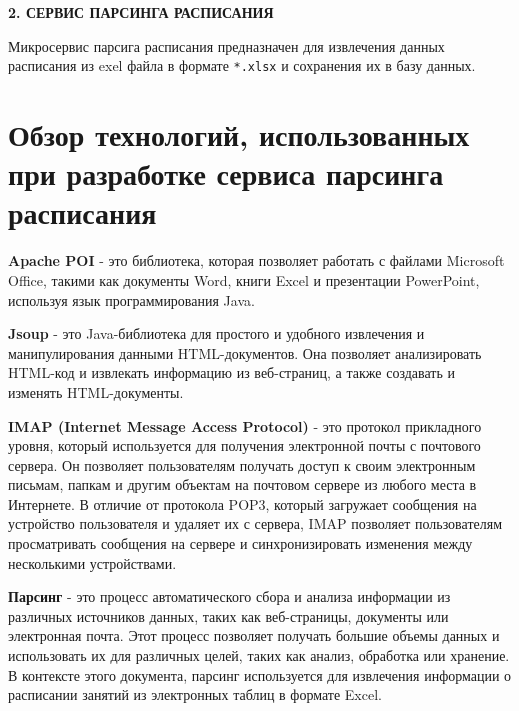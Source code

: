 \newpage
\begin{center}
    \textbf{\large 2. СЕРВИС ПАРСИНГА РАСПИСАНИЯ}
\end{center}

Микросервис парсига расписания предназначен для извлечения данных расписания из exel 
файла в формате \texttt{*.xlsx} и сохранения их в базу данных.

\section{Обзор технологий, использованных при разработке сервиса парсинга расписания}

\textbf{Apache POI} - это библиотека, которая позволяет работать с файлами Microsoft Office, 
такими как документы Word, книги Excel и презентации PowerPoint, используя язык программирования Java.

\textbf{Jsoup} - это Java-библиотека для простого и удобного извлечения и манипулирования данными HTML-документов. 
Она позволяет анализировать HTML-код и извлекать информацию из веб-страниц, 
а также создавать и изменять HTML-документы.

\textbf{IMAP (Internet Message Access Protocol)} - это протокол прикладного уровня, 
который используется для получения электронной почты с почтового сервера. 
Он позволяет пользователям получать доступ к своим электронным письмам, 
папкам и другим объектам на почтовом сервере из любого места в Интернете. 
В отличие от протокола POP3, который загружает сообщения на устройство пользователя и удаляет их 
с сервера, IMAP позволяет пользователям просматривать сообщения на сервере 
и синхронизировать изменения между несколькими устройствами.

\textbf{Парсинг} - это процесс автоматического сбора и анализа информации из различных источников данных, 
таких как веб-страницы, документы или электронная почта. 
Этот процесс позволяет получать большие объемы данных и использовать их для различных целей, 
таких как анализ, обработка или хранение. 
В контексте этого документа, парсинг используется для извлечения информации о 
расписании занятий из электронных таблиц в формате Excel.

